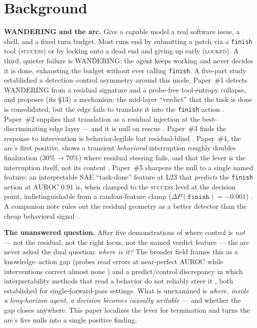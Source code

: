 \documentclass[11pt]{article}
\begin{document}
\section{Background}\label{sec:background}

\textbf{WANDERING and the arc.} Give a capable model a real software issue, a shell, and a fixed turn budget. Most runs end by submitting a patch via a \texttt{finish} tool (\textsc{success}) or by locking onto a dead end and giving up early (\textsc{locked}). A third, quieter failure is WANDERING: the agent keeps working and never decides it is done, exhausting the budget without ever calling \texttt{finish}. A five-part study established a detection--control asymmetry around this mode. Paper~\#1 detects WANDERING from a residual signature and a probe-free tool-entropy collapse, and proposes (its \S13) a mechanism: the mid-layer ``verdict'' that the task is done is consolidated, but the edge fails to translate it into the \texttt{finish} action \cite{tool_entropy}. Paper~\#2 supplies that translation as a residual injection at the best-discriminating edge layer --- and it is null on rescue \cite{residual_nulls}. Paper~\#3 finds the response to intervention is behavior-legible but residual-blind \cite{multichannel}. Paper~\#4, the arc's first positive, shows a transient \emph{behavioral} interruption roughly doubles finalization ($30\%\to70\%$) where residual steering fails, and that the lever is the interruption itself, not its content \cite{modality}. Paper~\#5 sharpens the null to a single named feature: an interpretable SAE ``task-done'' feature at L23 that \emph{predicts} the \texttt{finish} action at AUROC $0.91$ is, when clamped to the \textsc{success} level at the decision point, indistinguishable from a random-feature clamp ($\Delta P(\texttt{finish})=-0.001$) \cite{verdict_circuit}. A companion note rules out the residual geometry as a better detector than the cheap behavioral signal \cite{companion_note}.

\textbf{The unanswered question.} After five demonstrations of where control is \emph{not} --- not the residual, not the right locus, not the named verdict feature --- the arc never asked the dual question: \emph{where is it?} The broader field frames this as a knowledge--action gap (probes read errors at near-perfect AUROC while interventions correct almost none \cite{basu_kag}) and a predict/control discrepancy in which interpretability methods that read a behavior do not reliably steer it \cite{bhalla_pc}, both established for single-forward-pass settings. What is unexamined is \emph{where, inside a long-horizon agent, a decision becomes causally writable} --- and whether the gap closes anywhere. This paper localizes the lever for termination and turns the arc's five nulls into a single positive finding.
\end{document}
